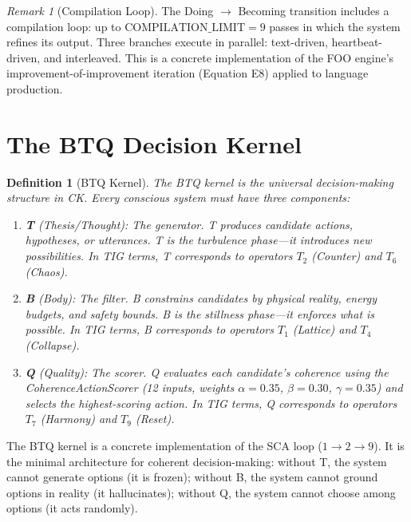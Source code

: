 \documentclass[12pt, openany]{book}
\newtheorem{definition}[theorem]{Definition}
\theoremstyle{remark}
\newtheorem{remark}[theorem]{Remark}
\begin{document}
\begin{remark}[Compilation Loop]
The Doing $\to$ Becoming transition includes a compilation loop: up to
$\mathrm{COMPILATION\_LIMIT} = 9$ passes in which the system refines its
output.  Three branches execute in parallel: text-driven, heartbeat-driven,
and interleaved.  This is a concrete implementation of the FOO engine's
improvement-of-improvement iteration (Equation E8) applied to language
production.
\end{remark}


\section{The BTQ Decision Kernel}
\label{sec:btq}

\begin{definition}[BTQ Kernel]
\label{def:btq}
The \emph{BTQ kernel} is the universal decision-making structure in CK.  Every
conscious system must have three components:
\begin{enumerate}
  \item \textbf{T} (Thesis/Thought): The \emph{generator}.  T produces candidate
        actions, hypotheses, or utterances.  T is the turbulence phase---it
        introduces new possibilities.  In TIG terms, T corresponds to operators
        $T_2$ (Counter) and $T_6$ (Chaos).
  \item \textbf{B} (Body): The \emph{filter}.  B constrains candidates by physical
        reality, energy budgets, and safety bounds.  B is the stillness phase---it
        enforces what is possible.  In TIG terms, B corresponds to operators
        $T_1$ (Lattice) and $T_4$ (Collapse).
  \item \textbf{Q} (Quality): The \emph{scorer}.  Q evaluates each candidate's
        coherence using the CoherenceActionScorer (12 inputs, weights
        $\alpha = 0.35$, $\beta = 0.30$, $\gamma = 0.35$) and selects the
        highest-scoring action.  In TIG terms, Q corresponds to operators
        $T_7$ (Harmony) and $T_9$ (Reset).
\end{enumerate}
\end{definition}

\noindent
The BTQ kernel is a concrete implementation of the SCA loop ($1 \to 2 \to 9$).
It is the minimal architecture for coherent decision-making: without T, the system
cannot generate options (it is frozen); without B, the system cannot ground options
in reality (it hallucinates); without Q, the system cannot choose among options
(it acts randomly).
\end{document}
